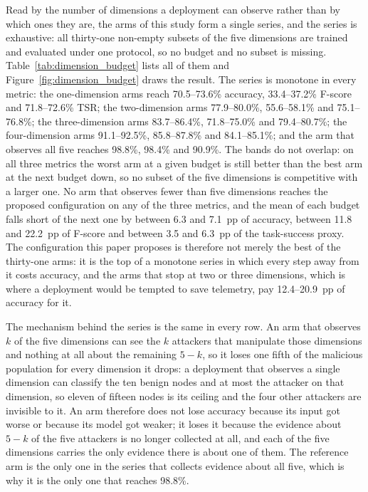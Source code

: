 \documentclass[notspecified,article,submit,moreauthors]{Definitions/mdpi}
\begin{document}
Read by the number of dimensions a deployment can observe rather than by which ones they are, the arms of this study form a single series, and the series is exhaustive: all thirty-one non-empty subsets of the five dimensions are trained and evaluated under one protocol, so no budget and no subset is missing. Table~\ref{tab:dimension_budget} lists all of them and Figure~\ref{fig:dimension_budget} draws the result. The series is monotone in every metric: the one-dimension arms reach 70.5--73.6\% accuracy, 33.4--37.2\% F-score and 71.8--72.6\% TSR; the two-dimension arms 77.9--80.0\%, 55.6--58.1\% and 75.1--76.8\%; the three-dimension arms 83.7--86.4\%, 71.8--75.0\% and 79.4--80.7\%; the four-dimension arms 91.1--92.5\%, 85.8--87.8\% and 84.1--85.1\%; and the arm that observes all five reaches 98.8\%, 98.4\% and 90.9\%. The bands do not overlap: on all three metrics the worst arm at a given budget is still better than the best arm at the next budget down, so no subset of the five dimensions is competitive with a larger one. No arm that observes fewer than five dimensions reaches the proposed configuration on any of the three metrics, and the mean of each budget falls short of the next one by between 6.3 and 7.1~pp of accuracy, between 11.8 and 22.2~pp of F-score and between 3.5 and 6.3~pp of the task-success proxy. The configuration this paper proposes is therefore not merely the best of the thirty-one arms: it is the top of a monotone series in which every step away from it costs accuracy, and the arms that stop at two or three dimensions, which is where a deployment would be tempted to save telemetry, pay 12.4--20.9~pp of accuracy for it.

The mechanism behind the series is the same in every row. An arm that observes $k$ of the five dimensions can see the $k$ attackers that manipulate those dimensions and nothing at all about the remaining $5-k$, so it loses one fifth of the malicious population for every dimension it drops: a deployment that observes a single dimension can classify the ten benign nodes and at most the attacker on that dimension, so eleven of fifteen nodes is its ceiling and the four other attackers are invisible to it. An arm therefore does not lose accuracy because its input got worse or because its model got weaker; it loses it because the evidence about $5-k$ of the five attackers is no longer collected at all, and each of the five dimensions carries the only evidence there is about one of them. The reference arm is the only one in the series that collects evidence about all five, which is why it is the only one that reaches 98.8\%.
\end{document}
